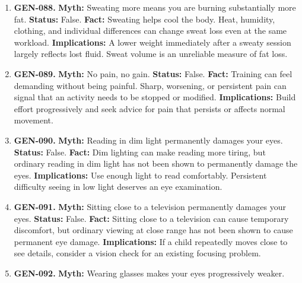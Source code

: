 \documentclass[11pt,oneside]{book}
\begin{document}
\begin{enumerate}[leftmargin=0pt,labelwidth=0pt,labelsep=0pt,itemindent=0pt]
\textbf{Implications:} Choose abdominal exercises for strength and function. Changes in body fat depend on a wider pattern of activity and energy intake.
\item[] \textbf{GEN-088.} \textbf{Myth:} Sweating more means you are burning substantially more fat.\newline
\textbf{Status:} False.\newline
\textbf{Fact:} Sweating helps cool the body. Heat, humidity, clothing, and individual differences can change sweat loss even at the same workload. \cite{ref191}\newline
\textbf{Implications:} A lower weight immediately after a sweaty session largely reflects lost fluid. Sweat volume is an unreliable measure of fat loss.
\item[] \textbf{GEN-089.} \textbf{Myth:} No pain, no gain.\newline
\textbf{Status:} False.\newline
\textbf{Fact:} Training can feel demanding without being painful. Sharp, worsening, or persistent pain can signal that an activity needs to be stopped or modified. \cite{ref193}\newline
\textbf{Implications:} Build effort progressively and seek advice for pain that persists or affects normal movement.
\item[] \textbf{GEN-090.} \textbf{Myth:} Reading in dim light permanently damages your eyes.\newline
\textbf{Status:} False.\newline
\textbf{Fact:} Dim lighting can make reading more tiring, but ordinary reading in dim light has not been shown to permanently damage the eyes. \cite{ref306}\newline
\textbf{Implications:} Use enough light to read comfortably. Persistent difficulty seeing in low light deserves an eye examination.
\item[] \textbf{GEN-091.} \textbf{Myth:} Sitting close to a television permanently damages your eyes.\newline
\textbf{Status:} False.\newline
\textbf{Fact:} Sitting close to a television can cause temporary discomfort, but ordinary viewing at close range has not been shown to cause permanent eye damage. \cite{ref306}\newline
\textbf{Implications:} If a child repeatedly moves close to see details, consider a vision check for an existing focusing problem.
\item[] \textbf{GEN-092.} \textbf{Myth:} Wearing glasses makes your eyes progressively weaker.\newline

\end{enumerate}
\end{document}
